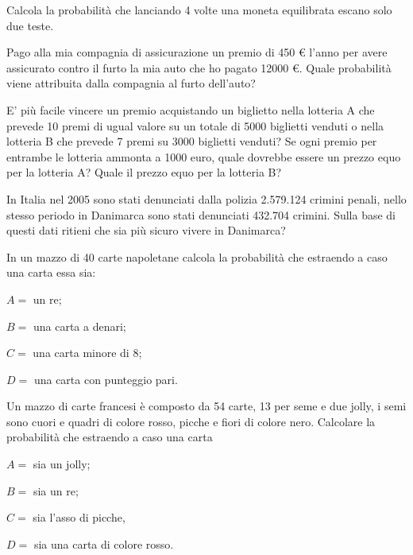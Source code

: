 \begin{esercizio}[\Ast]
 \label{ese:9.16}
Calcola la probabilità che lanciando 4 volte una moneta equilibrata escano solo due teste.
\end{esercizio}

\begin{esercizio}[\Ast]
 \label{ese:9.17}
Pago alla mia compagnia di assicurazione un premio di 450 € l'anno per avere assicurato contro il furto la mia auto che ho pagato 12000 €. Quale probabilità viene attribuita dalla compagnia al furto dell'auto?
\end{esercizio}

\begin{esercizio}[\Ast]
 \label{ese:9.18}
E' più facile vincere un premio acquistando un biglietto nella lotteria A che prevede 10 premi di ugual valore su un totale di 5000 biglietti venduti o nella lotteria B che prevede 7 premi su 3000 biglietti venduti?
Se ogni premio per entrambe le lotteria ammonta a 1000 euro, quale dovrebbe essere un prezzo equo per la lotteria A? Quale il prezzo equo per la lotteria B?
\end{esercizio}

\begin{esercizio}
 \label{ese:9.19}
In Italia nel 2005 sono stati denunciati dalla polizia 2.579.124 crimini penali, nello stesso periodo in Danimarca sono stati denunciati 432.704 crimini. Sulla base di questi dati ritieni che sia più sicuro vivere in Danimarca?
\end{esercizio}

\begin{esercizio}
 \label{ese:9.20}
 In un mazzo di 40 carte napoletane calcola la probabilità che estraendo a caso una carta essa sia:
\begin{itemize*}
\item $ A= $ un re;
\item $ B= $ una carta a denari;
\item $ C= $ una carta minore di 8;
\item $ D = $ una carta con punteggio pari.
\end{itemize*}
\end{esercizio}

\begin{esercizio}
 \label{ese:9.21}
Un mazzo di carte francesi è composto da 54 carte, 13 per seme e due jolly, i semi sono cuori e quadri di colore rosso, picche e fiori di colore nero. Calcolare la probabilità che estraendo a caso una carta
\begin{itemize*}
\item $ A= $ sia un jolly;
\item $ B= $ sia un re;
\item $ C= $ sia l'asso di picche,
\item $ D= $ sia una carta di colore rosso.
\end{itemize*}
\end{esercizio}

